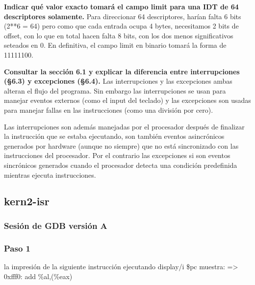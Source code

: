 \documentclass[a4paper]{article}
\begin{document}
\textbf{Indicar qué valor exacto tomará el campo limit para una IDT de 64 descriptores solamente.}\newline \newline
Para direccionar 64 descriptores, harían falta 6 bits (2**6 = 64) pero como que cada entrada ocupa 4 bytes, necesitamos 2 bits de offset, con lo que en total hacen falta 8 bits, con los dos menos significativos seteados en 0. En definitiva, el campo limit en binario tomará la forma de 11111100.

\textbf{Consultar la sección 6.1 y explicar la diferencia entre interrupciones (§6.3) y excepciones (§6.4).}\newline \newline
Las interrupciones y las excepciones ambas alteran el flujo del programa. Sin embargo las interrupciones se usan para manejar eventos externos (como el input del teclado) y las excepciones son usadas para manejar fallas en las instrucciones (como una división por cero).

Las interrupciones son además manejadas por el procesador después de finalizar la instrucción que se estaba ejecutando, son también eventos asincrónicos generados por hardware (aunque no siempre) que no está sincronizado con las instrucciones del procesador. Por el contrario las excepciones si son eventos sincrónicos generados cuando el procesador detecta una condición predefinida mientras ejecuta instrucciones.

\subsection{kern2-isr}

\subsubsection{Sesión de GDB versión A}

\subsubsection*{Paso 1} 
\begin{list}{•}
\item la impresión de la siguiente instrucción ejecutando display/i \$pc muestra: \newline
=> 0xfff0:	add    \%al,(\%eax) \newline \newline 
\end{list}
\end{document}

